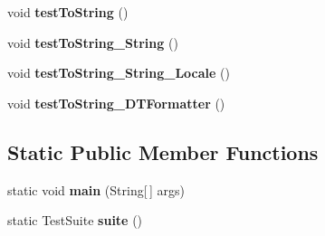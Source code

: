 \begin{DoxyCompactItemize}
\item 
\hypertarget{classorg_1_1joda_1_1time_1_1_test_time_of_day___basics_a8662de84709f0cd5b8ebfdbdd8c3c6b1}{void {\bfseries test\-To\-String} ()}\label{classorg_1_1joda_1_1time_1_1_test_time_of_day___basics_a8662de84709f0cd5b8ebfdbdd8c3c6b1}

\item 
\hypertarget{classorg_1_1joda_1_1time_1_1_test_time_of_day___basics_a9f74ecce5b33f460fe45ea41da0d515f}{void {\bfseries test\-To\-String\-\_\-\-String} ()}\label{classorg_1_1joda_1_1time_1_1_test_time_of_day___basics_a9f74ecce5b33f460fe45ea41da0d515f}

\item 
\hypertarget{classorg_1_1joda_1_1time_1_1_test_time_of_day___basics_a791af21e8d7dba61430a338326c240b4}{void {\bfseries test\-To\-String\-\_\-\-String\-\_\-\-Locale} ()}\label{classorg_1_1joda_1_1time_1_1_test_time_of_day___basics_a791af21e8d7dba61430a338326c240b4}

\item 
\hypertarget{classorg_1_1joda_1_1time_1_1_test_time_of_day___basics_af7e28ad946a0e94886290ad1c5f925c4}{void {\bfseries test\-To\-String\-\_\-\-D\-T\-Formatter} ()}\label{classorg_1_1joda_1_1time_1_1_test_time_of_day___basics_af7e28ad946a0e94886290ad1c5f925c4}

\end{DoxyCompactItemize}
\subsection*{Static Public Member Functions}
\begin{DoxyCompactItemize}
\item 
\hypertarget{classorg_1_1joda_1_1time_1_1_test_time_of_day___basics_a82b4530637dae61a2bb80883666fcb70}{static void {\bfseries main} (String\mbox{[}$\,$\mbox{]} args)}\label{classorg_1_1joda_1_1time_1_1_test_time_of_day___basics_a82b4530637dae61a2bb80883666fcb70}

\item 
\hypertarget{classorg_1_1joda_1_1time_1_1_test_time_of_day___basics_a83f52358844758333ea7886353bb3f38}{static Test\-Suite {\bfseries suite} ()}\label{classorg_1_1joda_1_1time_1_1_test_time_of_day___basics_a83f52358844758333ea7886353bb3f38}

\end{DoxyCompactItemize}
